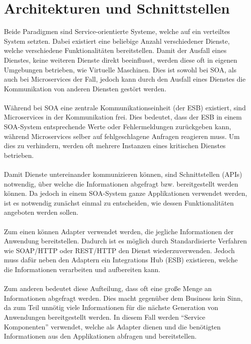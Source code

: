 \section{Architekturen und Schnittstellen}
\label{sec:ArchitekturenUndSchnittstellen}
Beide Paradigmen sind Service-orientierte Systeme, welche auf ein verteiltes System setzten. Dabei existiert eine beliebige Anzahl verschiedener Dienste, welche verschiedene Funktionalitäten bereitstellen. Damit der Ausfall eines Dienstes, keine weiteren Dienste direkt beeinflusst, werden diese oft in eigenen Umgebungen betrieben, wie Virtuelle Maschinen. Dies ist sowohl bei SOA, als auch bei Microservices der Fall, jedoch kann durch den Ausfall eines Dienstes die Kommunikation von anderen Diensten gestört werden.
\\\\
Während bei SOA eine zentrale Kommunikationseinheit (der ESB) existiert, sind Microservices in der Kommunikation frei. Dies bedeutet, dass der ESB in einem SOA-System entsprechende Werte oder Fehlermeldungen zurückgeben kann, während Microservices selber auf fehlgeschlagene Anfragen reagieren muss. Um dies zu verhindern, werden oft mehrere Instanzen eines kritischen Dienstes betrieben.
\\\\
Damit Dienste untereinander kommunizieren können, sind Schnittstellen (APIs) notwendig, über welche die Informationen abgefragt bzw. bereitgestellt werden können. Da jedoch in einem SOA-System ganze Applikationen verwendet werden, ist es notwendig zunächst einmal zu entscheiden, wie dessen Funktionalitäten angeboten werden sollen.
\\\\
Zum einen können Adapter verwendet werden, die jegliche Informationen der Anwendung bereitstellen. Dadurch ist es möglich durch Standardisierte Verfahren wie SOAP/HTTP oder REST/HTTP den Dienst wiederzuverwenden. Jedoch muss dafür neben den Adaptern ein Integrations Hub (ESB) existieren, welche die Informationen verarbeiten und aufbereiten kann. 
\\\\
Zum anderen bedeutet diese Aufteilung, dass oft eine große Menge an Informationen abgefragt werden. Dies macht gegenüber dem Business kein Sinn, da zum Teil unnötig viele Informationen für die nächste Generation von Anwendungen bereitgestellt werden. In diesem Fall werden "`Service Komponenten"' verwendet, welche als Adapter dienen und die benötigten Informationen aus den Applikationen abfragen und bereitstellen.

